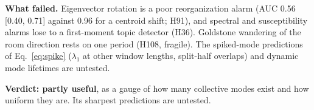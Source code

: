 \textbf{What failed.} Eigenvector rotation is a poor reorganization alarm (AUC 0.56 [0.40, 0.71] against 0.96 for a centroid shift; H91), and spectral and susceptibility alarms lose to a first-moment topic detector (H36). Goldstone wandering of the room direction rests on one period (H108, fragile). The spiked-mode predictions of Eq.~\eqref{eq:spike} ($\lambda_1$ at other window lengths, split-half overlaps) and dynamic mode lifetimes are untested.

\textbf{Verdict: partly useful}, as a gauge of how many collective modes exist and how uniform they are. Its sharpest predictions are untested.

